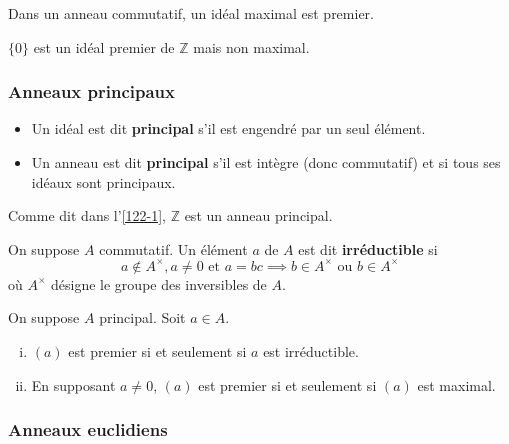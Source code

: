 	\begin{corollary}
		Dans un anneau commutatif, un idéal maximal est premier.
	\end{corollary}
	
	\begin{cexample}
		$\{ 0 \}$ est un idéal premier de $\mathbb{Z}$ mais non maximal.
	\end{cexample}
	
	\subsubsection{Anneaux principaux}
	
	
	\begin{definition}
		\begin{itemize}
			\item Un idéal est dit \textbf{principal} s'il est engendré par un seul élément.
			\item Un anneau est dit \textbf{principal} s'il est intègre (donc commutatif) et si tous ses idéaux sont principaux.
		\end{itemize}
	\end{definition}
	
	\begin{example}
		Comme dit dans l'\cref{122-1}, $\mathbb{Z}$ est un anneau principal.
	\end{example}
	
	
	\begin{definition}
		On suppose $A$ commutatif. Un élément $a$ de $A$ est dit \textbf{irréductible} si
		\[ a \notin A^\times, a \neq 0 \text{ et } a = bc \implies b \in A^\times \text{ ou } b \in A^\times \]
		où $A^\times$ désigne le groupe des inversibles de $A$.
	\end{definition}
	
	\begin{theorem}
		On suppose $A$ principal. Soit $a \in A$.
		\begin{enumerate}[(i)]
			\item $(a)$ est premier si et seulement si $a$ est irréductible.
			\item En supposant $a \neq 0$, $(a)$ est premier si et seulement si $(a)$ est maximal.
		\end{enumerate}
	\end{theorem}
	
	\subsubsection{Anneaux euclidiens}
	
